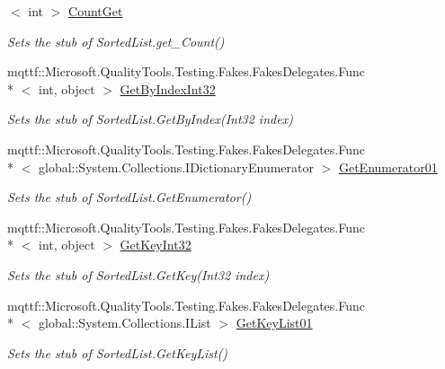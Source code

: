 \begin{DoxyCompactItemize}
$<$ int $>$ \hyperlink{class_system_1_1_collections_1_1_fakes_1_1_stub_sorted_list_ac46fde0d5dda64d22c9614e416a2de37}{Count\-Get}
\begin{DoxyCompactList}\small\item\em Sets the stub of Sorted\-List.\-get\-\_\-\-Count()\end{DoxyCompactList}\item 
mqttf\-::\-Microsoft.\-Quality\-Tools.\-Testing.\-Fakes.\-Fakes\-Delegates.\-Func\\*
$<$ int, object $>$ \hyperlink{class_system_1_1_collections_1_1_fakes_1_1_stub_sorted_list_aa62cac2ac90fd154f9fce3f8f9a2945b}{Get\-By\-Index\-Int32}
\begin{DoxyCompactList}\small\item\em Sets the stub of Sorted\-List.\-Get\-By\-Index(\-Int32 index)\end{DoxyCompactList}\item 
mqttf\-::\-Microsoft.\-Quality\-Tools.\-Testing.\-Fakes.\-Fakes\-Delegates.\-Func\\*
$<$ global\-::\-System.\-Collections.\-I\-Dictionary\-Enumerator $>$ \hyperlink{class_system_1_1_collections_1_1_fakes_1_1_stub_sorted_list_a74c03258a7c4320badef5cc793c6db33}{Get\-Enumerator01}
\begin{DoxyCompactList}\small\item\em Sets the stub of Sorted\-List.\-Get\-Enumerator()\end{DoxyCompactList}\item 
mqttf\-::\-Microsoft.\-Quality\-Tools.\-Testing.\-Fakes.\-Fakes\-Delegates.\-Func\\*
$<$ int, object $>$ \hyperlink{class_system_1_1_collections_1_1_fakes_1_1_stub_sorted_list_a9368cc7c6b311237a419680df7d44ff4}{Get\-Key\-Int32}
\begin{DoxyCompactList}\small\item\em Sets the stub of Sorted\-List.\-Get\-Key(\-Int32 index)\end{DoxyCompactList}\item 
mqttf\-::\-Microsoft.\-Quality\-Tools.\-Testing.\-Fakes.\-Fakes\-Delegates.\-Func\\*
$<$ global\-::\-System.\-Collections.\-I\-List $>$ \hyperlink{class_system_1_1_collections_1_1_fakes_1_1_stub_sorted_list_a4a70e8247a328cfd4af7729a1ccd9ea6}{Get\-Key\-List01}
\begin{DoxyCompactList}\small\item\em Sets the stub of Sorted\-List.\-Get\-Key\-List()\end{DoxyCompactList}\item 

\end{DoxyCompactItemize}
